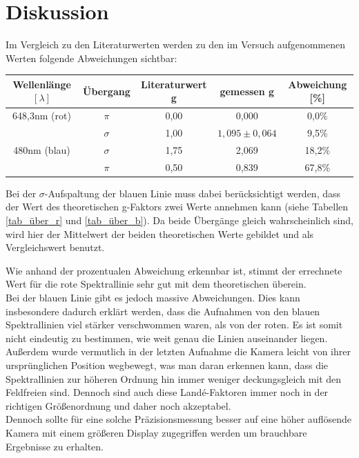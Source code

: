 \section{Diskussion}
Im Vergleich zu den Literaturwerten werden zu den im Versuch aufgenommenen Werten folgende Abweichungen sichtbar:
\begin{table}[htbp]
\begin{tabular}{|c|c|c|c|c|}
Wellenlänge $[\lambda]$ & Übergang & Literaturwert g& gemessen g& Abweichung [\%]\\\hline
648,3nm (rot) 	& $\pi$		&	0,00	&	0,000	&	0,0\%	\\\hline
				& $\sigma$	&	1,00	&	$1,095\pm0,064$	&	9,5\%	\\\hline
480nm (blau)	& $\sigma$	&	1,75	&	2,069	&	18,2\%\\\hline
				& $\pi$		&	0,50	&	0,839	&	67,8\%\\\hline
\end{tabular}
\end{table}

Bei der  $\sigma$-Aufspaltung der blauen Linie muss dabei berücksichtigt werden, dass der Wert des theoretischen g-Faktors zwei Werte annehmen kann (siehe Tabellen \ref{tab_über_r} und \ref{tab_über_b}). Da beide Übergänge gleich wahrscheinlich sind, wird hier der Mittelwert der beiden theoretischen Werte gebildet und als Vergleichswert benutzt.

Wie anhand der prozentualen Abweichung erkennbar ist, stimmt der errechnete Wert für die rote Spektrallinie sehr gut mit dem theoretischen überein.\\
Bei der blauen Linie gibt es jedoch massive Abweichungen. Dies kann insbesondere dadurch erklärt werden, dass die Aufnahmen von den blauen Spektrallinien viel stärker verschwommen waren, als von der roten. Es ist somit nicht eindeutig zu bestimmen, wie weit genau die Linien auseinander liegen. Außerdem wurde vermutlich in der letzten Aufnahme die Kamera leicht von ihrer ursprünglichen Position wegbewegt, was man daran erkennen kann, dass die Spektrallinien zur höheren Ordnung hin immer weniger deckungsgleich mit den Feldfreien sind. Dennoch sind auch diese Landé-Faktoren immer noch in der richtigen Größenordnung und daher noch akzeptabel.\\

Dennoch sollte für eine solche Präzisionsmessung besser auf eine höher auflösende Kamera mit einem größeren Display zugegriffen werden um brauchbare Ergebnisse zu erhalten.




